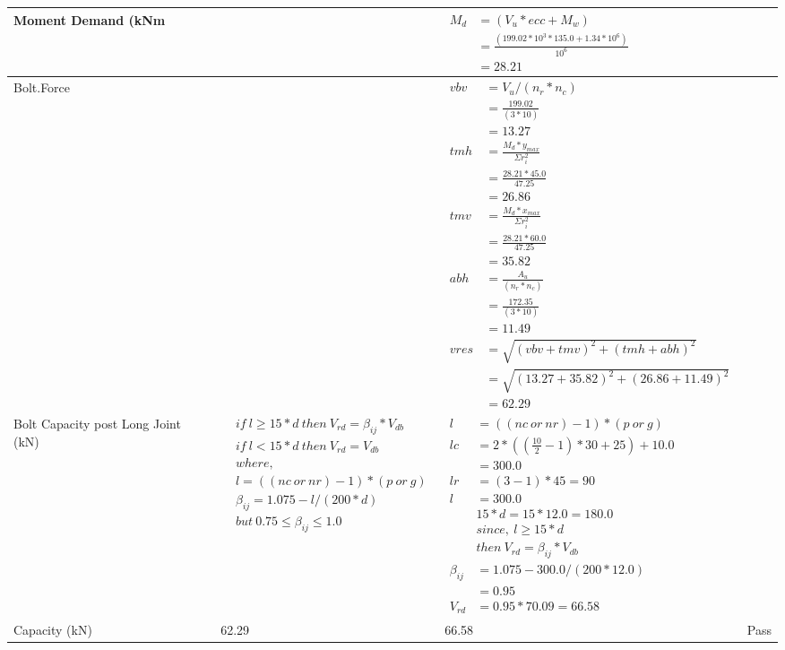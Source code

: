 \documentclass{article}%
\begin{document}
\begin{longtable}{|p{4cm}|p{5cm}|p{5.5cm}|p{1.5cm}|}
\hline%
Moment Demand (kNm&&$\begin{aligned}  M_d &= (V_u * ecc + M_w)\\  &= \frac{(199.02 * 10^3 *135.0 + 1.34*10^6)}{10^6}\\  & =28.21\end{aligned}$&\\%
\hline%
Bolt.Force&&$\begin{aligned} vbv~~ &= V_u / (n_r * n_c)\\  &= \frac{199.02}{ (3*10)}\\  & =13.27\\ tmh~ &= \frac{M_d * y_{max} }{ \Sigma r_i^2} \\  &= \frac{28.21 *45.0}{47.25}\\  & =26.86\\  tmv ~&= \frac{M_d * x_{max}}{\Sigma r_i^2}\\ &= \frac{28.21 * 60.0}{47.25}\\  & =35.82\\  abh~ & = \frac{A_u }{(n_r * n_c)}\\   & =\frac{172.35}{ (3 *10)}\\  & =11.49\\  vres &=\sqrt{(vbv +tmv) ^ 2 + (tmh+abh) ^ 2}\\   &= \sqrt{(13.27 +35.82) ^2 + (26.86+11.49) ^ 2}\\  & =62.29\end{aligned}$&\\%
\hline%
Bolt Capacity post Long Joint (kN)&$\begin{aligned} &if~l\geq 15 * d~then~V_{rd} = \beta_{ij} * V_{db} \\ & if~l < 15 * d~then~V_{rd} = V_{db} \\ & where,\\ & l = ((nc~or~nr) - 1) * (p~or~g) \\ & \beta_{ij} = 1.075 - l/(200 * d) \\ & but~0.75\leq\beta_{ij}\leq1.0 \end{aligned}$&$\begin{aligned} l&= ((nc~or~nr) - 1) * (p~or~g) \\  lc&= 2*((\frac{10}{2} - 1) * 30+25)+ 10.0\\&=300.0\\  lr&= (3 - 1) * 45=90\\  l&= 300.0\\ & 15 * d = 15 * 12.0 = 180.0 \\ &since,~l \geq 15 * d~ \\&then~V_{rd} = \beta_{ij} * V_{db} \\ \beta_{ij} &= 1.075 - 300.0/(200*12.0) \\&=0.95\\ V_{rd} &= 0.95 * 70.09=66.58 \end{aligned}$&\\%
\hline%
Capacity (kN)&62.29&66.58&Pass\\%
\hline%
\end{longtable}
\end{document}

